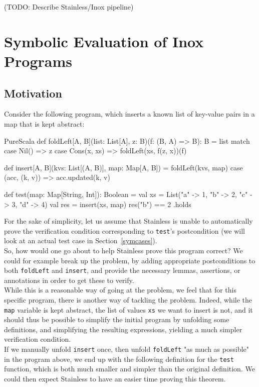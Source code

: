 \documentclass[a4paper,twoside]{article}
\newcommand{\TODO}[1]{\textcolor{YellowOrange}{(TODO: #1)}} %
\newcommand{\RefSec}[1]{Section~\ref{#1}}
\newcommand{\stt}[1]{\texttt{\small{#1}}}
\begin{document}
\TODO{Describe Stainless/Inox pipeline}

\clearpage
\section{Symbolic Evaluation of Inox Programs}
\label{symbolic}

\subsection{Motivation}

Consider the following program, which inserts a known list of key-value pairs in a map that is kept abstract:

\begin{ShortCode}{PureScala}
def foldLeft[A, B](list: List[A], z: B)(f: (B, A) => B): B = list match {
  case Nil() => z
  case Cons(x, xs) => foldLeft(xs, f(z, x))(f)
}

def insert[A, B](kvs: List[(A, B)], map: Map[A, B]) = {
  foldLeft(kvs, map) {
    case (acc, (k, v)) => acc.updated(k, v)
  }
}

def test(map: Map[String, Int]): Boolean = {
  val xs = List("a" -> 1, "b" -> 2, "c" -> 3, "d" -> 4)
  val res = insert(xs, map)
  res("b") == 2
}.holds
\end{ShortCode}

For the sake of simplicity, let us assume that Stainless is unable to automatically prove the verification condition corresponding to \stt{test}'s postcondition (we will look at an actual test case in \RefSec{symcases}).\\

So, how would one go about to help Stainless prove this program correct? We could for example break up the problem, by adding appropriate postconditions to both \stt{foldLeft} and \stt{insert}, and provide the necessary lemmas, assertions, or annotations in order to get these to verify.\\

While this is a reasonable way of going at the problem, we feel that for this specific program, there is another way of tackling the problem. Indeed, while the \stt{map} variable is kept abstract, the list of values \stt{xs} we want to insert is not, and it should thus be possible to simplify the initial program by unfolding some definitions, and simplifying the resulting expressions, yielding a much simpler verification condition.\\

If we manually unfold \stt{insert} once, then unfold \stt{foldLeft} "as much as possible" in the program above, we end up with the following definition for the \stt{test} function, which is both much smaller and simpler than the original definition. We could then expect Stainless to have an easier time proving this theorem.
\end{document}
